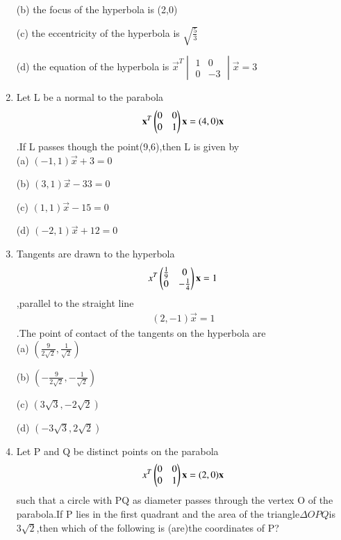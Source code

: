 \documentclass[journal,12pt,twocolumn]{IEEEtran}
\begin{document}
\begin{enumerate}
    \choice (b) the focus of the hyperbola is (2,0)
    
    \choice (c) the eccentricity of the hyperbola is $\sqrt{\frac{5}{3}}$
    
    \choice (d) the equation of the hyperbola is $\vec x^T \begin{vmatrix}
    1& 0 \\0 & -3 \end{vmatrix} \vec x=3$\\
    
    \item Let L be a normal to the parabola \begin{align}\mathbf x^T \begin{pmatrix}0& 0 \\0 & 1\end{pmatrix}\mathbf x=(4,0)\mathbf x\end{align}.If L passes though the point(9,6),then L is given by\\
    
     \choice (a) $(-1,1)\vec x+3=0$
     
     \choice (b) $(3,1)\vec x-33=0$
     
     \choice (c) $(1,1)\vec x-15=0$
     
     \choice (d) $(-2,1)\vec x+12=0$\\
     
     \item Tangents are drawn to the hyperbola \begin{align} x^T \begin{pmatrix}\frac{1}{9}& 0 \\0 & -\frac{1}{4}\end{pmatrix}\mathbf x=1\end{align},parallel to the straight line \begin{align}(2,-1)\vec x=1\end{align}.The point of contact of the tangents on the hyperbola are \\
    
    \choice (a) $(\frac{9}{2\sqrt{2}},\frac{1}{\sqrt{2}})$
    
    \choice (b) $(-\frac{9}{2\sqrt{2}},-\frac{1}{\sqrt{2}})$
    
    \choice (c) $(3\sqrt{3},-2\sqrt{2})$
    
    \choice (d) $(-3\sqrt{3},2\sqrt{2})$\\
    
    \item Let P and Q be distinct points on the parabola \begin{align} x^T \begin{pmatrix}0& 0 \\0 & 1\end{pmatrix}\mathbf x=(2,0)\mathbf x\end{align}such that a circle with PQ as diameter passes through the vertex O of the parabola.If P lies in the first quadrant and the area of the triangle$ \Delta OPQ $is $3\sqrt{2}$,then which of the following is (are)the coordinates of P?\\
    

\end{enumerate}
\end{document}
